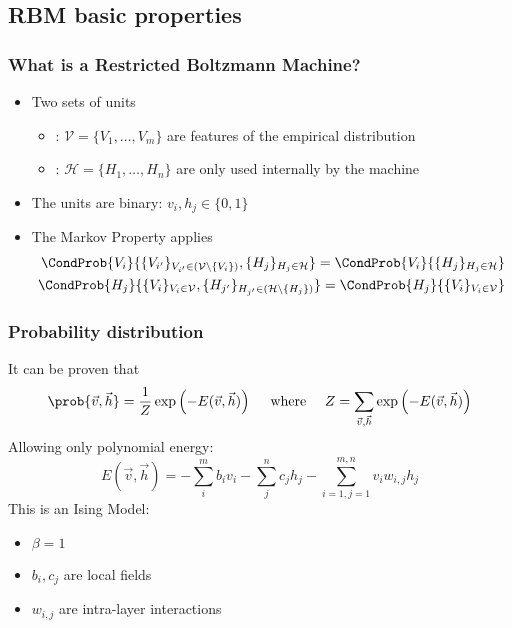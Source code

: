 \subsection{RBM basic properties}
\begin{frame}
  \frametitle{What is a Restricted Boltzmann Machine?}
  \begin{itemize}
    \item<1-> Two sets of \alert{units}
      \begin{itemize}
        \item {}: \(\mathcal{V} = \{V_1, \dots, V_m\}\) are features of the empirical distribution
        \item {}: \(\mathcal{H} = \{H_1, \dots, H_n\}\) are only used internally by the machine
      \end{itemize}
    \item<2-> The units are \alert{binary}: \(v_i, h_j \in \{0,1\}\)
    \item<3-> The \alert{Markov Property} applies
      \begin{align*}
        \CondProb{V_i}{\{V_{i'}\}_{V_{i'}\in (\mathcal{V} \setminus \{V_i\})}, \{H_j\}_{H_j\in \mathcal{H}}} =
        \CondProb{V_i}{\{H_j\}_{H_j\in \mathcal{H}}} \\
        \CondProb{H_j}{\{V_i\}_{V_i\in \mathcal{V}}, \{H_{j'}\}_{H_{j'}\in (\mathcal{H} \setminus \{H_j\})}} =
        \CondProb{H_j}{\{V_i\}_{V_i\in \mathcal{V}}}
      \end{align*}
  \end{itemize}
	\begin{figure}[<1->]
		\resizebox{0.6\textwidth}{!}{}
	\end{figure}
\end{frame}

\begin{frame}
  \frametitle{Probability distribution}
	It can be proven that
	\[\prob{\vec{v}, \vec{h}} = \frac{1}{Z} \exp\left(-E(\vec{v}, \vec{h})\right)
	\quad\text{ where }\quad
	Z = \sum_{\vec{v}, \vec{h}}\exp\left(-E(\vec{v}, \vec{h})\right)\]
	\pause
	Allowing only polynomial energy:
	\[
	E(\vec{v}, \vec{h}) = -\sum_{i}^m b_i v_i - \sum_{j}^n c_j h_j -
	\sum_{i=1,j=1}^{m,n} v_i w_{i,j} h_j
	\]
  \pause
  This is an \alert{Ising Model}:
  \begin{itemize}
    \item \(\beta = 1\)
    \item \(b_i, c_j\) are local fields
    \item \(w_{i,j}\) are intra-layer interactions
  \end{itemize}
\end{frame}

